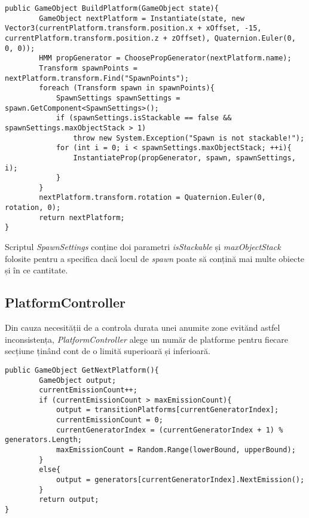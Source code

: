 \begin{lstlisting}[caption=Funcțiile din PlatformBuilder,
  label=a_label]
public GameObject BuildPlatform(GameObject state){
        GameObject nextPlatform = Instantiate(state, new Vector3(currentPlatform.transform.position.x + xOffset, -15, currentPlatform.transform.position.z + zOffset), Quaternion.Euler(0, 0, 0));
        HMM propGenerator = ChoosePropGenerator(nextPlatform.name);
        Transform spawnPoints = nextPlatform.transform.Find("SpawnPoints");
        foreach (Transform spawn in spawnPoints){
            SpawnSettings spawnSettings = spawn.GetComponent<SpawnSettings>();
            if (spawnSettings.isStackable == false && spawnSettings.maxObjectStack > 1)
                throw new System.Exception("Spawn is not stackable!");
            for (int i = 0; i < spawnSettings.maxObjectStack; ++i){
                InstantiateProp(propGenerator, spawn, spawnSettings, i);
            }
        }
        nextPlatform.transform.rotation = Quaternion.Euler(0, rotation, 0);
        return nextPlatform;
}
\end{lstlisting}

Scriptul \textit{SpawnSettings} conține doi parametri \textit{isStackable} și \textit{maxObjectStack} folosite pentru a specifica dacă locul de \textit{spawn} poate să conțină mai multe obiecte și în ce cantitate.\par

\subsection{PlatformController}

Din cauza necesității de a controla durata unei anumite zone evitănd astfel inconsistența, \textit{PlatformController} alege un număr de platforme pentru fiecare secțiune ținând cont de o limită superioară și inferioară.\par

\begin{lstlisting}[caption=Funcțiile din PlatformController,
  label=a_label,
  mathescape=false]
public GameObject GetNextPlatform(){
        GameObject output;
        currentEmissionCount++;
        if (currentEmissionCount > maxEmissionCount){
            output = transitionPlatforms[currentGeneratorIndex];
            currentEmissionCount = 0;
            currentGeneratorIndex = (currentGeneratorIndex + 1) % generators.Length;
            maxEmissionCount = Random.Range(lowerBound, upperBound);
        }
        else{
            output = generators[currentGeneratorIndex].NextEmission();
        }
        return output;
}
\end{lstlisting}
